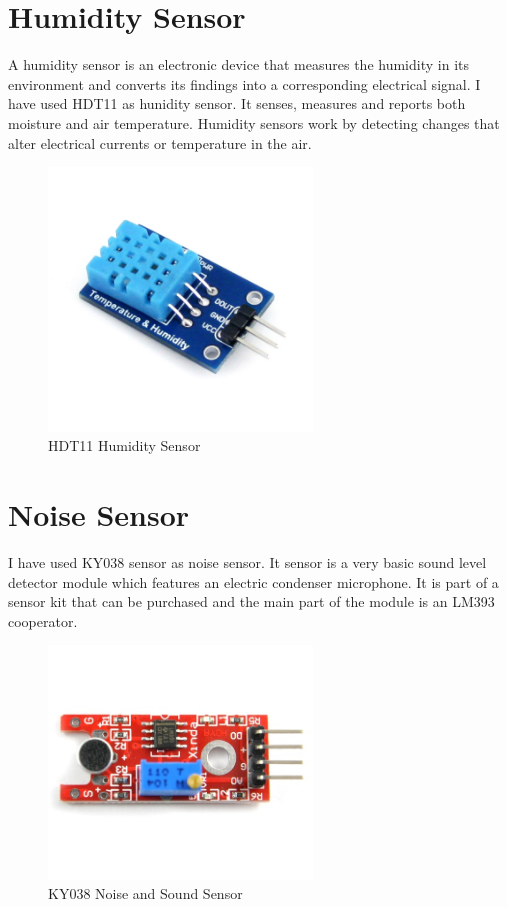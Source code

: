 \section{Humidity Sensor}
A humidity sensor is an electronic device that measures the humidity in its environment and converts its findings into a corresponding electrical signal. I have used HDT11 as hunidity sensor. It senses, measures and reports both moisture and air temperature. Humidity sensors work by detecting changes that alter electrical currents or temperature in the air.\cite{kuang2007high}
\begin{figure} [h!]
\centering
 \includegraphics[width=7cm]{Results/hdt111.jpg}
 \caption[]{HDT11 Humidity Sensor}
    \label{}
\end{figure}
\section{Noise Sensor}
I have used KY038 sensor as noise sensor. It sensor is a very basic sound level detector module which features an electric condenser microphone. It is part of a sensor kit that can be purchased and the main part of the module is an LM393 cooperator. \cite{chen2008determining}
\begin{figure} [h!]
\centering
 \includegraphics[width=7cm]{Results/ky038.jpg}
 \caption[]{KY038 Noise and Sound Sensor}
    \label{}
\end{figure}

